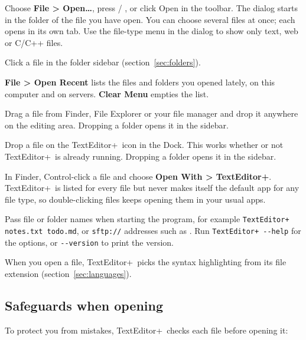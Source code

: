 \documentclass[11pt,a4paper]{article}
\newcommand{\appname}{TextEditor+}
\newcommand{\menu}[1]{\textsf{\textbf{#1}}}
\newcommand{\ui}[1]{\textsf{#1}}
\begin{document}
\begin{description}[style=nextline, leftmargin=1.5em]
  \item[Open dialog]
    Choose \menu{File > Open…}, press  / , or click
    \ui{Open} in the toolbar. The dialog starts in the folder of the file you
    have open. You can choose several files at once; each opens in its own
    tab. Use the file-type menu in the dialog to show only text, web or C/C++
    files.
  \item[The sidebar]
    Click a file in the folder sidebar (section~\ref{sec:folders}).
  \item[Open Recent]
    \menu{File > Open Recent} lists the files and folders you opened lately,
    on this computer and on servers. \menu{Clear Menu} empties the list.
  \item[Drag onto the window]
    Drag a file from Finder, File Explorer or your file manager and drop it
    anywhere on the editing area. Dropping a folder opens it in the sidebar.
  \item[Drag onto the Dock icon (macOS)]
    Drop a file on the \appname\ icon in the Dock. This works whether or not
    \appname\ is already running. Dropping a folder opens it in the sidebar.
  \item[Open With (macOS)]
    In Finder, Control-click a file and choose
    \menu{Open With > \appname}. \appname\ is listed for every file but never
    makes itself the default app for any file type, so double-clicking files
    keeps opening them in your usual apps.
  \item[Command line]
    Pass file or folder names when starting the program, for example
    \texttt{TextEditor+ notes.txt todo.md}, or \texttt{sftp://} addresses such
    as . Run \texttt{TextEditor+ -{}-help} for the
    options, or \texttt{-{}-version} to print the version.
\end{description}

When you open a file, \appname\ picks the syntax highlighting from its file
extension (section~\ref{sec:languages}).

\subsection{Safeguards when opening}

To protect you from mistakes, \appname\ checks each file before opening it:
\end{document}
